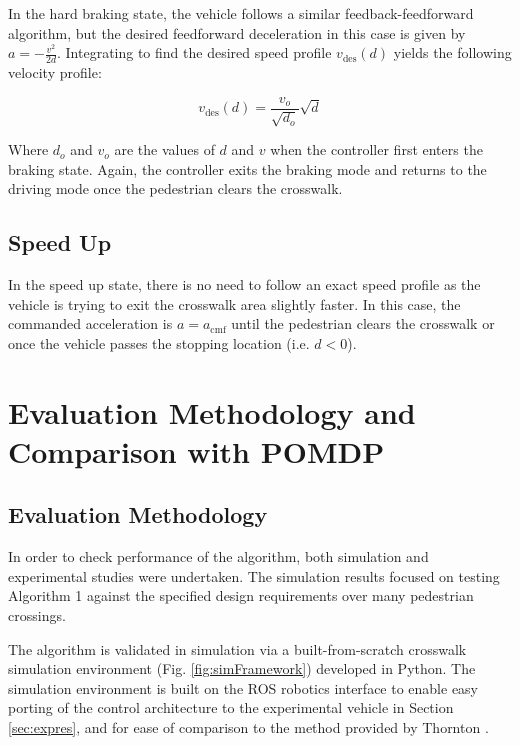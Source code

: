 \documentclass[letterpaper, 10 pt, conference]{ieeeconf}  %
\begin{document}
In the hard braking state, the vehicle follows a similar feedback-feedforward algorithm, but the desired feedforward deceleration in this case is given by $a = -\frac{v^2}{2d}$. Integrating to find the desired speed profile $v_\mathrm{des}(d)$ yields the following velocity profile: 

\begin{equation}
v_\mathrm{des}(d) = \frac{v_o}{\sqrt{d_o}}\sqrt{d}
\end{equation}     

Where $d_o$ and $v_o$ are the values of $d$ and $v$ when the controller first enters the braking state. Again, the controller exits the braking mode and returns to the driving mode once the pedestrian clears the crosswalk. 

\subsection{Speed Up}

In the speed up state, there is no need to follow an exact speed profile as the vehicle is trying to exit the crosswalk area slightly faster. In this case, the commanded acceleration is $a = a_\mathrm{cmf}$ until the pedestrian clears the crosswalk or once the vehicle passes the stopping location (i.e. $d< 0$). 

\section{Evaluation Methodology and Comparison with POMDP}

\subsection{Evaluation Methodology}

In order to check performance of the algorithm, both simulation and experimental studies were undertaken. The simulation results focused on testing Algorithm 1 against the specified design requirements over many pedestrian crossings. 

The algorithm is validated in simulation via a built-from-scratch crosswalk simulation environment (Fig. \ref{fig:simFramework}) developed in Python. The simulation environment is built on the ROS robotics interface to enable easy porting of the control architecture to the experimental vehicle in Section \ref{sec:expres}, and for ease of comparison to the method provided by Thornton \cite{Thornton2018}.   
\end{document}
